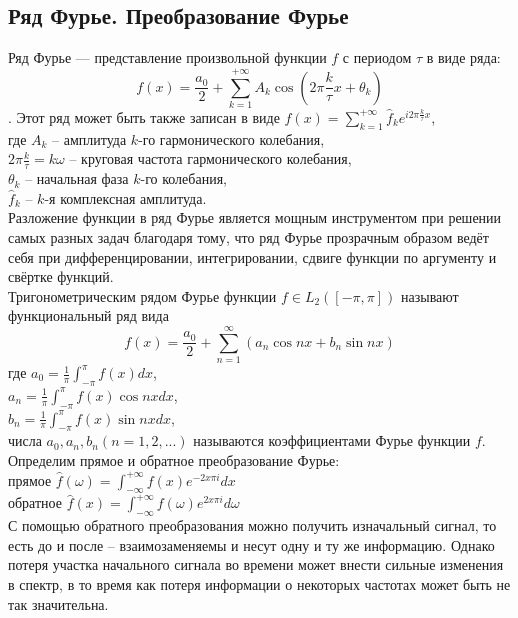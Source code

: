 \documentclass[a4paper]{article}
\begin{document}
\subsection{Ряд Фурье. Преобразование Фурье}
Ряд Фурье — представление произвольной функции $f$ с периодом $\tau$ в виде ряда: $$f(x)=\frac{a_0}{2}+\sum_{k=1}^{+\infty}A_k\cos{(2\pi\frac{k}{\tau}x+\theta_k)}$$. Этот ряд может быть также записан в виде $f(x)=\sum_{k=1}^{+\infty}\widehat{f}_k e^{i2\pi\frac{k}{\tau}x}$,\\
где $A_k$ -- амплитуда $k$-го гармонического колебания,\\
$2\pi\frac{k}{\tau}=k\omega$ -- круговая частота гармонического колебания,\\
$\theta_k$ -- начальная фаза $k$-го колебания,\\
$\widehat{f}_k$ -- $k$-я комплексная амплитуда.\\
Разложение функции в ряд Фурье является мощным инструментом при решении самых разных задач благодаря тому, что ряд Фурье прозрачным образом ведёт себя при дифференцировании, интегрировании, сдвиге функции по аргументу и свёртке функций.\\
Тригонометрическим рядом Фурье функции $f\in L_2([-\pi, \pi])$ называют функциональный ряд вида $$f(x)=\frac{a_0}{2}+\sum_{n=1}^{\infty}(a_n\cos{nx}+b_n\sin{nx})$$
где $a_0=\frac{1}{\pi}\int_{-\pi}^{\pi}f(x)dx$,\\
$a_n=\frac{1}{\pi}\int_{-\pi}^{\pi}f(x)\cos{nx}dx$,\\
$b_n=\frac{1}{\pi}\int_{-\pi}^{\pi}f(x)\sin{nx}dx$,\\
числа $a_0, a_n, b_n (n=1,2,...)$ называются коэффициентами Фурье функции $f$.\\
Определим прямое и обратное преобразование Фурье:\\
прямое $\widehat{f}(\omega)=\int_{-\infty}^{+\infty}f(x)e^{-2x\pi i}dx$\\
обратное $\widehat{f}(x)=\int_{-\infty}^{+\infty}f(\omega)e^{2x\pi i}d\omega$\\
С помощью обратного преобразования можно получить изначальный сигнал, то есть до и после -- взаимозаменяемы и несут одну и ту же информацию. Однако потеря участка начального сигнала во времени может внести сильные изменения в спектр, в то время как потеря информации о некоторых частотах может быть не так значительна.
\end{document}
